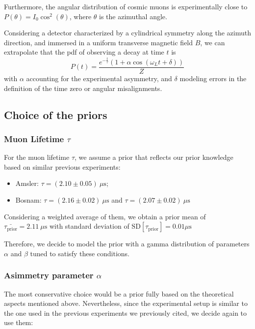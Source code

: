 \documentclass[
]{article}
\providecommand{\tightlist}{%
  \setlength{\itemsep}{0pt}\setlength{\parskip}{0pt}}
\begin{document}
Furthermore, the angular distribution of cosmic muons is experimentally
close to \(P(\theta) = I_0 \cos^2(\theta)\), where \(\theta\) is the
azimuthal angle.

Considering a detector characterized by a cylindrical symmetry along the
azimuth direction, and immersed in a uniform transverse magnetic field
\(B\), we can extrapolate that the pdf of observing a decay at time
\(t\) is \[
P(t) = \frac{e^{-\frac{t}{\tau}} (1+\alpha \cos(\omega_L t + \delta))}{Z}
\] with \(\alpha\) accounting for the experimental asymmetry, and
\(\delta\) modeling errors in the definition of the time zero or angular
misalignments.

\subsection{Choice of the priors}\label{choice-of-the-priors}

\subsubsection{\texorpdfstring{Muon Lifetime
\(\tau\)}{Muon Lifetime \textbackslash tau}}\label{muon-lifetime-tau}

For the muon lifetime \(\tau\), we assume a prior that reflects our
prior knowledge based on similar previous experiments:

\begin{itemize}
\tightlist
\item
  Amsler: \(\tau = (2.10\pm0.05)\ \mu\text{s}\);
\item
  Bosnam: \(\tau = (2.16\pm0.02)\ \mu\text{s}\) and
  \(\tau = (2.07\pm0.02)\ \mu\text{s}\)
\end{itemize}

Considering a weighted average of them, we obtain a prior mean of
\(\bar{\tau_{\text{prior}}} = 2.11\  \mu\text{s}\) with standard
deviation of \(\text{SD}[{\tau_{\text{prior}}}] = 0.01  \mu\text{s}\)

Therefore, we decide to model the prior with a gamma distribution of
parameters \(\alpha\) and \(\beta\) tuned to satisfy these conditions.

\subsubsection{\texorpdfstring{Asimmetry parameter
\(\alpha\)}{Asimmetry parameter \textbackslash alpha}}\label{asimmetry-parameter-alpha}

The most conservative choice would be a prior fully based on the
theoretical aspects mentioned above. Nevertheless, since the
experimental setup is similar to the one used in the previous
experiments we previously cited, we decide again to use them:
\end{document}
